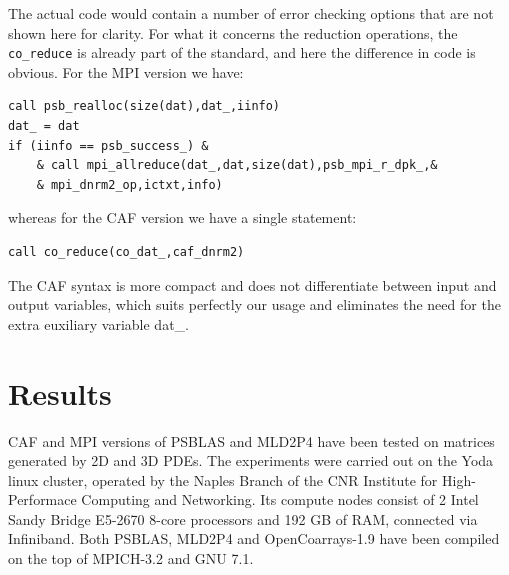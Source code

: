 \documentclass{IOS-Book-Article}
\begin{document}
\fi
The actual code would contain a number of error checking options that
are not shown here for clarity.
For what it concerns the reduction operations, the \verb|co_reduce| is
already part of the standard, and here the difference in code is
obvious. For the  MPI version we have:
\begin{center}
{\small
\begin{lstlisting}
call psb_realloc(size(dat),dat_,iinfo)
dat_ = dat
if (iinfo == psb_success_) &
    & call mpi_allreduce(dat_,dat,size(dat),psb_mpi_r_dpk_,&
    & mpi_dnrm2_op,ictxt,info)

\end{lstlisting}}
\end{center}
whereas for  the CAF version we have a single statement: 
\begin{center}
{\small
\begin{lstlisting}
call co_reduce(co_dat_,caf_dnrm2)
\end{lstlisting}}
\end{center}
The CAF syntax is more compact and does not differentiate between
input and output variables, which suits perfectly our usage and
eliminates the need for  the extra euxiliary variable dat\_. 



\section{Results}
CAF and MPI versions of PSBLAS and MLD2P4 have been tested on matrices
generated by 2D and 3D PDEs. 
The experiments were carried out on the Yoda linux cluster, operated
by the Naples Branch of the CNR Institute for High-Performace
Computing and Networking. Its compute nodes consist of 2 Intel Sandy
Bridge E5-2670 8-core processors and 192 GB of RAM, connected via
Infiniband. 
Both PSBLAS, MLD2P4 and OpenCoarrays-1.9 have been compiled on the top
of MPICH-3.2 and GNU 7.1. 
\end{document}
